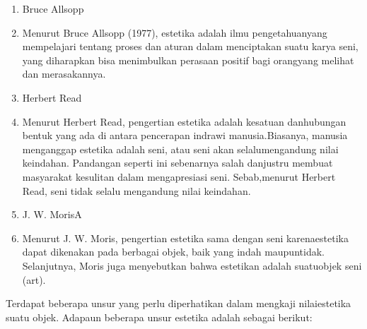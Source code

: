 \documentclass[../manperil.tex]{subfiles}
\begin{document}
\begin{enumerate}
	\item Bruce Allsopp
	\item[] Menurut Bruce Allsopp (1977), estetika adalah ilmu pengetahuanyang mempelajari tentang proses dan aturan dalam menciptakan suatu karya seni, yang diharapkan bisa menimbulkan perasaan positif bagi orangyang melihat dan merasakannya.

	\item Herbert Read
	\item[] Menurut Herbert Read, pengertian estetika adalah kesatuan danhubungan bentuk yang ada di antara pencerapan indrawi manusia.Biasanya, manusia menganggap estetika adalah seni, atau seni akan selalumengandung nilai keindahan. Pandangan seperti ini sebenarnya salah danjustru membuat masyarakat kesulitan dalam mengapresiasi seni. Sebab,menurut Herbert Read, seni tidak selalu mengandung nilai keindahan.

	\item J. W. MorisA
	\item[] Menurut J. W. Moris, pengertian estetika sama dengan seni karenaestetika dapat dikenakan pada berbagai objek, baik yang indah maupuntidak. Selanjutnya, Moris juga menyebutkan bahwa estetikan adalah suatuobjek seni (art).

\end{enumerate}

Terdapat beberapa unsur yang perlu diperhatikan dalam mengkaji nilaiestetika suatu objek. Adapaun beberapa unsur estetika adalah sebagai berikut:
\end{document}
